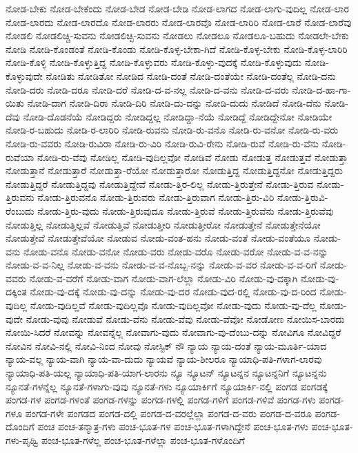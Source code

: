{ನೋಡ-ಬೇಕು
ನೋಡ-ಬೇಕೆಂದು
ನೋಡ-ಬೇಡ
ನೋಡ-ಬೇಡಿ
ನೋಡ-ಲಾಗದ
ನೋಡ-ಲಾಗು-ವುದಿಲ್ಲ
ನೋಡ-ಲಾರ
ನೋಡ-ಲಾರದು
ನೋಡ-ಲಾರದೊ
ನೋಡ-ಲಾರರು
ನೋಡ-ಲಾರವೊ
ನೋಡ-ಲಾರಿರಿ
ನೋಡ-ಲಾರೆ
ನೋಡ-ಲಾರೆವು
ನೋಡಲಿ
ನೋಡಲಿಚ್ಚಿ-ಸುವನು
ನೋಡಲಿಚ್ಛಿ-ಸುವನು
ನೋಡಲು
ನೋಡಲೂ
ನೋಡಲೂ-ಬಹುದು
ನೋಡಲೇ-ಬೇಕು
ನೋಡಿ
ನೋಡಿ-ಕೊಂಡಂತೆ
ನೋಡಿ-ಕೊಂಡು
ನೋಡಿ-ಕೊಳ್ಳ-ಬೇಕಾ-ಗಿದೆ
ನೋಡಿ-ಕೊಳ್ಳ-ಬೇಕು
ನೋಡಿ-ಕೊಳ್ಳ-ಲಾರಿರಿ
ನೋಡಿ-ಕೊಳ್ಳಿ
ನೋಡಿ-ಕೊಳ್ಳುತ್ತಿದ್ದ
ನೋಡಿ-ಕೊಳ್ಳುವರು
ನೋಡಿ-ಕೊಳ್ಳು-ವುದಕ್ಕೆ
ನೋಡಿ-ಕೊಳ್ಳುವುದು
ನೋಡಿ-ಕೊಳ್ಳುವುದೇ
ನೋಡಿತು
ನೋಡಿತೋ
ನೋಡಿದ
ನೋಡಿ-ದಂತೆ
ನೋಡಿ-ದಂತೆಯೇ
ನೋಡಿ-ದಂತೆಲ್ಲ
ನೋಡಿ-ದನು
ನೋಡಿ-ದರು
ನೋಡಿ-ದರೂ
ನೋಡಿ-ದರೆ
ನೋಡಿ-ದ-ವ-ನಲ್ಲ
ನೋಡಿ-ದ-ವನು
ನೋಡಿ-ದ-ವರು
ನೋಡಿ-ದ-ಹಾ-ಗಾ-ಯಿತು
ನೋಡಿ-ದಾಗ
ನೋಡಿ-ದಿರಾ
ನೋಡಿ-ದಿರಿ
ನೋಡಿ-ದು-ದನ್ನು
ನೋಡಿ-ದುದು
ನೋಡಿದೆ
ನೋಡಿ-ದೆನು
ನೋಡಿ-ದೆವು
ನೋಡಿ-ದೊಡನೆಯೆ
ನೋಡಿದ್ದರು
ನೋಡಿದ್ದಲ್ಲ
ನೋಡಿದ್ದಾ-ನೆಯೆ
ನೋಡಿದ್ದೆ
ನೋಡಿದ್ದೇನೋ
ನೋಡಿಯೇ
ನೋಡಿ-ರ-ಬಹುದು
ನೋಡಿ-ರ-ಲಾರಿರಿ
ನೋಡಿ-ರುವನು
ನೋಡಿ-ರು-ವನೊ
ನೋಡಿ-ರು-ವನೋ
ನೋಡಿ-ರು-ವರು
ನೋಡಿ-ರು-ವವರು
ನೋಡಿ-ರುವಿರಾ
ನೋಡಿ-ರು-ವಿರಿ
ನೋಡಿ-ರುವಿ-ರೇನು
ನೋಡಿ-ರುವೆ
ನೋಡಿ-ರು-ವೆನು
ನೋಡಿ-ರುವೆಯಾ
ನೋಡಿ-ರು-ವೆವು
ನೋಡಿಲ್ಲ
ನೋಡಿ-ವುದಿಲ್ಲವೋ
ನೋಡಿವೆ
ನೋಡು
ನೋಡುತ್ತ
ನೋಡುತ್ತವೆ
ನೋಡುತ್ತಾ
ನೋಡುತ್ತಾನೆ
ನೋಡುತ್ತಾರೆ
ನೋಡುತ್ತಾ-ರೆಯೋ
ನೋಡುತ್ತಾರೋ
ನೋಡುತ್ತಿದ್ದ
ನೋಡುತ್ತಿದ್ದನೋ
ನೋಡುತ್ತಿದ್ದರು
ನೋಡುತ್ತಿದ್ದರೆ
ನೋಡುತ್ತಿದ್ದವು
ನೋಡುತ್ತಿದ್ದೇವೆ
ನೋಡು-ತ್ತಿರ-ಲಿಲ್ಲ
ನೋಡು-ತ್ತಿರುತ್ತೇನೆ
ನೋಡು-ತ್ತಿರುವ
ನೋಡು-ತ್ತಿರುವನು
ನೋಡು-ತ್ತಿರುವನೊ
ನೋಡು-ತ್ತಿರುವರು
ನೋಡು-ತ್ತಿರುವಾಗ
ನೋಡು-ತ್ತಿರು-ವಿರಿ
ನೋಡು-ತ್ತಿರುವಿ-ರೆಂಬುದು
ನೋಡು-ತ್ತಿರು-ವುದು
ನೋಡು-ತ್ತಿರುವುದೂ
ನೋಡು-ತ್ತಿರುವೆ
ನೋಡು-ತ್ತಿರುವೆನು
ನೋಡು-ತ್ತಿರುವೆವು
ನೋಡುತ್ತಿಲ್ಲ
ನೋಡುತ್ತಿಲ್ಲವೆ
ನೋಡುತ್ತಿವೆ
ನೋಡುತ್ತೀರಿ
ನೋಡುತ್ತೀರೋ
ನೋಡುತ್ತೇನೆ
ನೋಡುತ್ತೇನೆಯೋ
ನೋಡುತ್ತೇವೆ
ನೋಡುತ್ತೇವೆಯೋ
ನೋಡುವ
ನೋಡು-ವಂತ-ಹನು
ನೋಡು-ವಂತೆ
ನೋಡು-ವಂತೆಯೂ
ನೋಡು-ವನು
ನೋಡು-ವನೊ
ನೋಡು-ವನೋ
ನೋಡು-ವರು
ನೋಡು-ವರೊ
ನೋಡು-ವರೋ
ನೋಡು-ವ-ವ-ನನ್ನು
ನೋಡು-ವ-ವ-ನಿಲ್ಲ
ನೋಡು-ವ-ವನು
ನೋಡು-ವ-ವ-ನೊಬ್ಬ-ನನ್ನು
ನೋಡು-ವ-ವರ
ನೋಡು-ವ-ವ-ರಿಗೆ
ನೋಡು-ವವರು
ನೋಡು-ವ-ವರೆಗೆ
ನೋಡು-ವಾಗ
ನೋಡು-ವಾಗ-ಲೆಲ್ಲಾ
ನೋಡು-ವಿರಿ
ನೋಡು-ವು-ದಕ್ಕಾಗಿ
ನೋಡು-ವು-ದಕ್ಕಿಂತ
ನೋಡು-ವು-ದಕ್ಕೆ
ನೋಡು-ವು-ದನ್ನು
ನೋಡು-ವು-ದರ
ನೋಡು-ವುದ-ರಲ್ಲಿ
ನೋಡು-ವು-ದ-ರಿಂದ
ನೋಡು-ವುದಿಲ್ಲ
ನೋಡು-ವುದಿಲ್ಲವೆ
ನೋಡು-ವುದಿಲ್ಲವೊ
ನೋಡು-ವುದಿಲ್ಲವೋ
ನೋಡು-ವುದು
ನೋಡು-ವು-ದೆಲ್ಲ
ನೋಡು-ವುದೇ
ನೋಡು-ವುವು
ನೋಡುವೆ
ನೋಡು-ವೆನು
ನೋಡು-ವೆವು
ನೋಡು-ವೆವೋ
ನೋಡೋಣ
ನೋಯಿಸ-ಬಾರದು
ನೋಯಿ-ಸಿದರೆ
ನೋವನ್ನು
ನೋವನ್ನೆಲ್ಲ
ನೋವಾಗು-ವುದು
ನೋವಾಗು-ವು-ದೆಂಬು-ದನ್ನು
ನೋವಿಗೂ
ನೋವಿದ್ದರೆ
ನೋವಿನ
ನೋವಿ-ನಲ್ಲಿ
ನೋವಿ-ನಿಂದ
ನೋವು
ನೋಸ್ಟಿಕ್
ನೌ
ನ್ಯಾಯ
ನ್ಯಾಯ-ದಂತೆ
ನ್ಯಾಯ-ಮೂರ್ತಿ-ಯಾದ
ನ್ಯಾಯ-ವಲ್ಲ
ನ್ಯಾಯ-ವಾಗಿ
ನ್ಯಾಯ-ವಾ-ದುದು
ನ್ಯಾಯವೆ
ನ್ಯಾಯ-ಶೀಲರೂ
ನ್ಯಾಯಾಧಿ-ಪತಿ-ಗಳಾಗ-ಲಾರವು
ನ್ಯಾಯಾಧಿ-ಪತಿ-ಯಲ್ಲ
ನ್ಯಾಯಾಧಿ-ಪತಿ-ಯಾಗ-ಲಾರನು
ನ್ಯೂ
ನ್ಯೂಟನ್
ನ್ಯೂಟನ್ನನ
ನ್ಯೂಟನ್ನನಿಗೆ
ನ್ಯೂಟನ್ನನು
ನ್ಯೂನತೆ-ಗಳನ್ನೆಲ್ಲ
ನ್ಯೂನತೆ-ಗಳಾಗು-ವುವು
ನ್ಯೂನತೆ-ಗಳು
ನ್ಯೂಯಾರ್ಕಿಗೆ
ನ್ಯೂಯಾರ್ಕಿ-ನಲ್ಲಿ
ಪಂಗಡ
ಪಂಗಡಕ್ಕೆ
ಪಂಗಡ-ಗಳ
ಪಂಗಡ-ಗಳಂತೆ
ಪಂಗಡ-ಗಳನ್ನು
ಪಂಗಡ-ಗಳಲ್ಲಿ
ಪಂಗಡ-ಗಳಿಗೆ
ಪಂಗಡ-ಗಳಿವೆ
ಪಂಗಡ-ಗಳು
ಪಂಗಡ-ಗಳೂ
ಪಂಗಡ-ಗಳೇ
ಪಂಗಡದ
ಪಂಗಡ-ದಲ್ಲಿ
ಪಂಗಡ-ದ-ವರಲ್ಲೆಲ್ಲಾ
ಪಂಗಡ-ದ-ವರು
ಪಂಗಡ-ದ-ವರೂ
ಪಂಗಡ-ದೊಂದಿಗೆ
ಪಂಚ
ಪಂಚ-ತನ್ಮಾತ್ರ-ಗಳು
ಪಂಚ-ಭೂತ-ಗಳ
ಪಂಚ-ಭೂತ-ಗಳಾಗಿದ್ದೇನೆ
ಪಂಚ-ಭೂತ-ಗಳು
ಪಂಚ-ಭೂತ-ಗಳು-ಪೃಥ್ವಿ
ಪಂಚ-ಭೂತ-ಗಳೆಲ್ಲ
ಪಂಚ-ಭೂತ-ಗಳೆಲ್ಲಾ
ಪಂಚ-ಭೂತ-ಗಳೊಂದಿಗೆ
}
